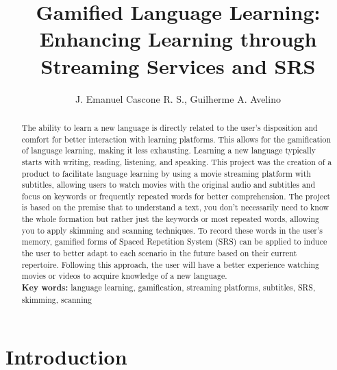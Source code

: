 \documentclass[12pt]{article}
\title{Gamified Language Learning: Enhancing Learning through Streaming Services and SRS}
\author{J. Emanuel Cascone R. S.\inst{1}, Guilherme A. Avelino\inst{1} }
\begin{document}
 

\maketitle

\begin{abstract} 
  The ability to learn a new language is directly related to the user's disposition and comfort for better interaction with learning platforms. This allows for the gamification of language learning, making it less exhausting. Learning a new language typically starts with writing, reading, listening, and speaking. This project was the creation of a product to facilitate language learning by using a movie streaming platform with subtitles, allowing users to watch movies with the original audio and subtitles and focus on keywords or frequently repeated words for better comprehension. The project is based on the premise that to understand a text, you don't necessarily need to know the whole formation but rather just the keywords or most repeated words, allowing you to apply skimming and scanning techniques. To record these words in the user's memory, gamified forms of Spaced Repetition System (SRS) can be applied to induce the user to better adapt to each scenario in the future based on their current repertoire. Following this approach, the user will have a better experience watching movies or videos to acquire knowledge of a new language. \\
  \textbf{Key words:} language learning, gamification, streaming platforms, subtitles, SRS, skimming, scanning
\end{abstract} 



\section{Introduction} 
\end{document}
